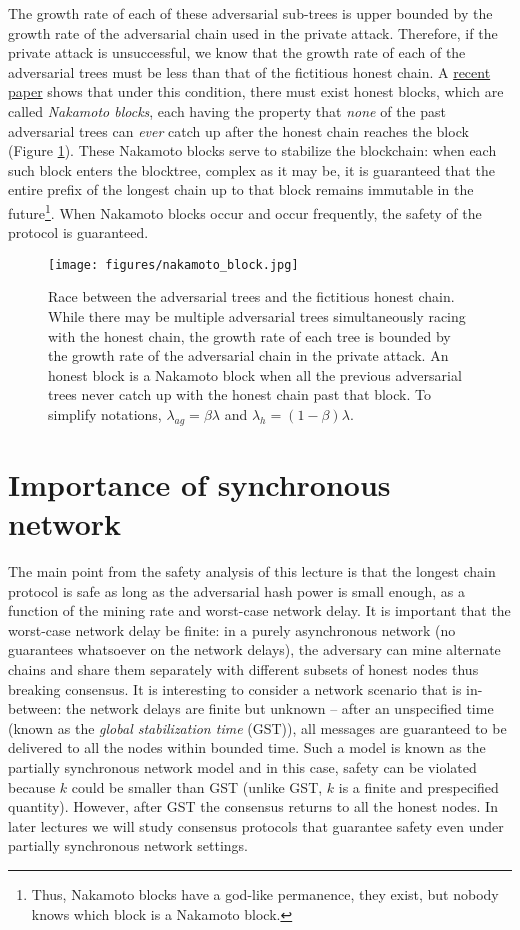 \documentclass{article}
\begin{document}
The growth rate of each of these adversarial sub-trees is upper bounded by the growth rate of the adversarial chain used in the private attack.  Therefore, if the private attack is unsuccessful, we know that the growth rate of each of the adversarial trees must be less than that of the fictitious honest chain. A  \href{https://arxiv.org/pdf/2005.10484.pdf}{recent paper} shows that under this  condition, there must exist honest blocks, which are called {\em Nakamoto blocks}, each having the property that {\em none} of the past adversarial trees can {\em ever} catch up after the honest chain reaches the block (Figure \ref{fig:nakamoto_block}). These Nakamoto blocks serve to stabilize the blockchain: when each such block enters the blocktree, complex as it may be, it is guaranteed that the entire prefix of the longest chain  up to that block remains immutable in the future\footnote{Thus, Nakamoto blocks have a god-like permanence, they exist, but nobody knows which block is a Nakamoto block.}. When Nakamoto blocks occur and occur frequently, the safety of the protocol is guaranteed.

\begin{figure}
     \centering
     \texttt{[image: figures/nakamoto\_block.jpg]}
   \caption{Race between the adversarial trees and the fictitious honest chain. While there may be multiple adversarial trees simultaneously racing with the honest chain, the growth rate of each tree is bounded by the growth rate of the adversarial chain in the private attack. An honest block is a Nakamoto block when all the previous adversarial trees  never catch up with the honest chain past that block. To simplify notations, $\lambda_{ag} = \beta \lambda$ and $\lambda_h = (1-\beta)\lambda$.}
   \label{fig:nakamoto_block}
\end{figure}


\section*{Importance of synchronous network}
The main point from the safety analysis of this lecture is that the longest chain protocol is safe as long as the adversarial hash power is small enough, as a function of the mining rate and worst-case network delay. It is important that the worst-case network delay be finite: in a  purely asynchronous network (no guarantees whatsoever on the network delays), the adversary can mine alternate chains and share them separately with different subsets of honest nodes thus breaking consensus. It is interesting to consider a network scenario that is in-between: the network delays are finite but unknown -- after an unspecified time (known as the {\em global stabilization time} (GST)), all messages are guaranteed to be delivered to all the nodes within bounded time. Such a  model is known as the partially synchronous network model and in this case, safety can be violated because $k$  could be smaller than GST (unlike GST, $k$ is a finite and prespecified quantity). However, after GST the consensus returns to all the honest nodes.  In later lectures we will study consensus protocols that guarantee safety even under partially synchronous network settings. 
\end{document}
